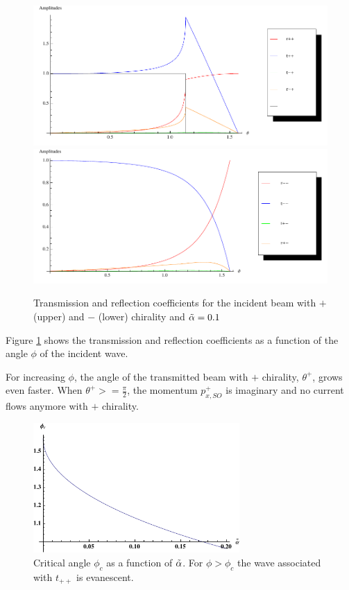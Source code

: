 \begin{figure}[h!tp]
    \includegraphics[width=\textwidth]{zero-plus.pdf}
    \includegraphics[width=\textwidth]{zero-minus.pdf}
    \caption{Transmission and reflection coefficients for the
            incident beam with $+$ (upper) and $-$ (lower) chirality
            and $\tilde \alpha = 0.1$}
    \label{fig:trans-zero}
\end{figure}

Figure \ref{fig:trans-zero} shows the transmission and reflection
coefficients as a function of the angle $\phi$ of the incident wave.

For increasing $\phi$, the angle of the transmitted beam with $+$
chirality, $\theta^+$, grows even faster. When $\theta^+ >=
\frac{\pi}{2}$, the momentum $p_{x,SO}^+$ is imaginary and no current flows
anymore with $+$ chirality. 

\begin{figure}[tbh]
    \begin{center}
        \includegraphics[width=0.7\textwidth]{critical-angle.pdf}
    \end{center}
    \caption{Critical angle $\phi_c$ as a function of $\tilde \alpha$. For $\phi
        > \phi_c$ the wave associated with $t_{++}$ is evanescent.}
    \label{fig:critical-angle}
\end{figure}

